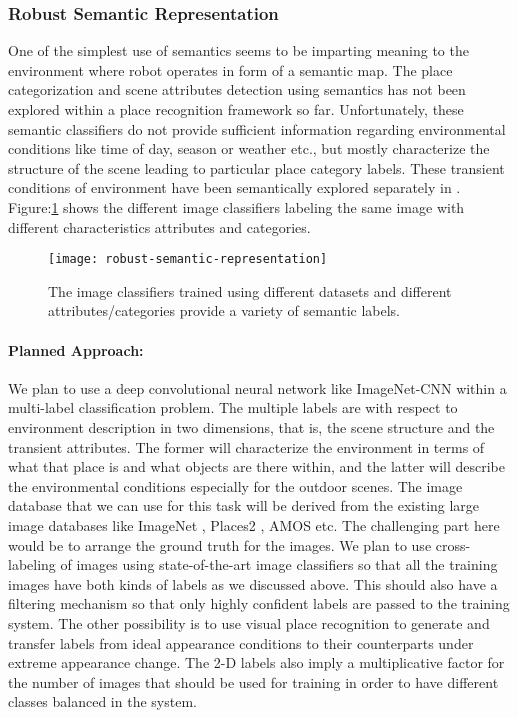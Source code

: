 \documentclass{article}
\begin{document}
\subsubsection{Robust Semantic Representation}
One of the simplest use of semantics seems to be imparting meaning to the environment where robot operates in form of a semantic map. The place categorization \cite{zhou2014learning} and scene attributes detection \cite{Patterson2012SunAttributes} using semantics has not been explored within a place recognition framework so far. Unfortunately, these semantic classifiers do not provide sufficient information regarding environmental conditions like time of day, season or weather etc., but mostly characterize the structure of the scene leading to particular place category labels. These transient conditions of environment have been semantically explored separately in \cite{laffont2014transient}. Figure:\ref{fig:robustSemRep} shows the different image classifiers labeling the same image with different characteristics attributes and categories.

\begin{figure}[htbp]
 \centering
 \texttt{[image: robust-semantic-representation]}
 \caption{The image classifiers trained using different datasets and different attributes/categories provide a variety of semantic labels.}
 \label{fig:robustSemRep}
\end{figure}

\paragraph{Planned Approach:}
We plan to use a deep convolutional neural network like ImageNet-CNN \cite{krizhevsky2012imagenet} within a multi-label classification problem. The multiple labels are with respect to environment description in two dimensions, that is, the scene structure and the transient attributes. The former will characterize the environment in terms of what that place is and what objects are there within, and the latter will describe the environmental conditions especially for the outdoor scenes. The image database that we can use for this task will be derived from the existing large image databases like ImageNet \cite{deng2009imagenet}, Places2 \cite{zhou2014learning}, AMOS \cite{jacobs2007consistent} etc. The challenging part here would be to arrange the ground truth for the images. We plan to use cross-labeling of images using state-of-the-art image classifiers so that all the training images have both kinds of labels as we discussed above. This should also have a filtering mechanism so that only highly confident labels are passed to the training system. The other possibility is to use visual place recognition to generate and transfer labels from ideal appearance conditions to their counterparts under extreme appearance change. The 2-D labels also imply a multiplicative factor for the number of images that should be used for training in order to have different classes balanced in the system. 
\end{document}
